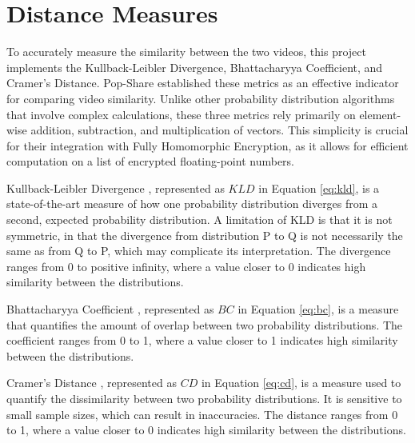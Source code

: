 \section{Distance Measures}
\label{sec:Background Distance Measures}
To accurately measure the similarity between the two videos, this project implements the Kullback-Leibler Divergence, Bhattacharyya Coefficient, and Cramer’s Distance. Pop-Share \cite{Lagesse2021-PopShare} established these metrics as an effective indicator for comparing video similarity. Unlike other probability distribution algorithms that involve complex calculations, these three metrics rely primarily on element-wise addition, subtraction, and multiplication of vectors. This simplicity is crucial for their integration with Fully Homomorphic Encryption, as it allows for efficient computation on a list of encrypted floating-point numbers.

Kullback-Leibler Divergence \cite{Kullback1951-bg}, represented as $KLD$ in Equation \ref{eq:kld}, is a state-of-the-art measure of how one probability distribution diverges from a second, expected probability distribution. A limitation of KLD is that it is not symmetric, in that the divergence from distribution P to Q is not necessarily the same as from Q to P, which may complicate its interpretation. The divergence ranges from 0 to positive infinity, where a value closer to 0 indicates high similarity between the distributions.



Bhattacharyya Coefficient \cite{Bhattacharyya1933-fw}, represented as $BC$ in Equation \ref{eq:bc}, is a measure that quantifies the amount of overlap between two probability distributions. The coefficient ranges from 0 to 1, where a value closer to 1 indicates high similarity between the distributions.



Cramer’s Distance \cite{Cramer1928-sw}, represented as $CD$ in Equation \ref{eq:cd}, is a measure used to quantify the dissimilarity between two probability distributions. It is sensitive to small sample sizes, which can result in inaccuracies. The distance ranges from 0 to 1, where a value closer to 0 indicates high similarity between the distributions.


